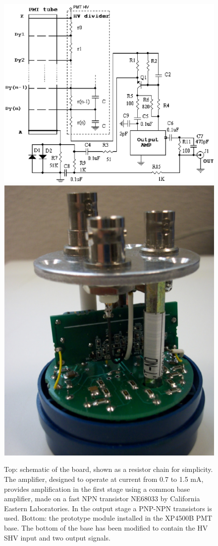 \begin{figure}
	\centering
	\includegraphics[width=1.25\columnwidth, keepaspectratio]{img/dividerSchematic.png}
	\includegraphics[width=0.75\columnwidth, height=0.95\columnwidth]{img/pmtWithDivider.png}
	\caption{Top: schematic of the board, shown as a resistor chain for simplicity. The amplifier, designed to operate at current from 0.7 to 1.5 mA,
            provides amplification in the first stage using a common base amplifier, made on a fast NPN transistor NE68033 by California Eastern Laboratories.
            In the output stage a PNP-NPN transistors is used.
            Bottom: the prototype module installed in the XP4500B PMT base.
            The bottom of the base has been modified to contain the HV SHV input and two output signals. }
	\label{fig:pmtWithDivider}
\end{figure}

